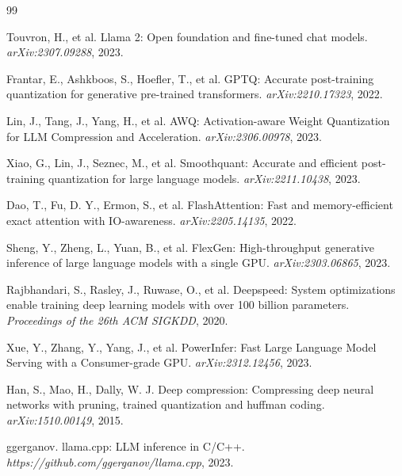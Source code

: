 \documentclass[twocolumn,10pt]{article}
\begin{document}
\begin{thebibliography}{99}

Touvron, H., et al.
\newblock Llama 2: Open foundation and fine-tuned chat models.
\newblock \textit{arXiv:2307.09288}, 2023.

Frantar, E., Ashkboos, S., Hoefler, T., et al.
\newblock GPTQ: Accurate post-training quantization for generative pre-trained transformers.
\newblock \textit{arXiv:2210.17323}, 2022.

Lin, J., Tang, J., Yang, H., et al.
\newblock AWQ: Activation-aware Weight Quantization for LLM Compression and Acceleration.
\newblock \textit{arXiv:2306.00978}, 2023.

Xiao, G., Lin, J., Seznec, M., et al.
\newblock Smoothquant: Accurate and efficient post-training quantization for large language models.
\newblock \textit{arXiv:2211.10438}, 2023.

Dao, T., Fu, D. Y., Ermon, S., et al.
\newblock FlashAttention: Fast and memory-efficient exact attention with IO-awareness.
\newblock \textit{arXiv:2205.14135}, 2022.

Sheng, Y., Zheng, L., Yuan, B., et al.
\newblock FlexGen: High-throughput generative inference of large language models with a single GPU.
\newblock \textit{arXiv:2303.06865}, 2023.

Rajbhandari, S., Rasley, J., Ruwase, O., et al.
\newblock Deepspeed: System optimizations enable training deep learning models with over 100 billion parameters.
\newblock \textit{Proceedings of the 26th ACM SIGKDD}, 2020.

Xue, Y., Zhang, Y., Yang, J., et al.
\newblock PowerInfer: Fast Large Language Model Serving with a Consumer-grade GPU.
\newblock \textit{arXiv:2312.12456}, 2023.

Han, S., Mao, H., Dally, W. J.
\newblock Deep compression: Compressing deep neural networks with pruning, trained quantization and huffman coding.
\newblock \textit{arXiv:1510.00149}, 2015.

ggerganov.
\newblock llama.cpp: LLM inference in C/C++.
\newblock \textit{https://github.com/ggerganov/llama.cpp}, 2023.

\end{thebibliography}
\end{document}
